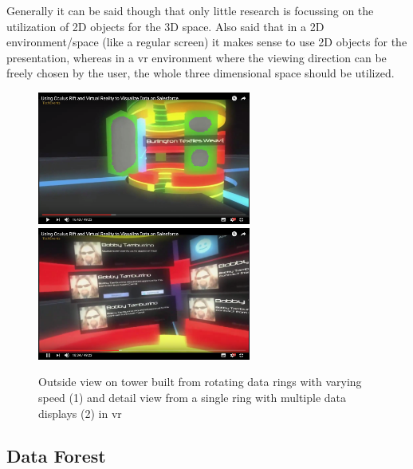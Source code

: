 Generally it can be said though that only little research is focussing on the utilization of 2D objects for the 3D space. Also \cite{Kwon2015} said that in a 2D environment/space (like a regular screen) it makes sense to use 2D objects for the presentation, whereas in a \gls{vr} environment where the viewing direction can be freely chosen by the user, the whole three dimensional space should be utilized.
\begin{figure}[h]
	\begin{center}
		\includegraphics[width=7cm]{03_Figures/05_LitReview/CodeScience2015b.png}
		\includegraphics[width=7cm]{03_Figures/05_LitReview/CodeScience2015a.png}
		\caption[Outside view on tower built from rotating data rings with varying speed and detail view from a single ring with multiple data displays in \gls{vr}]{Outside view on tower built from rotating data rings with varying speed (1) and detail view from a single ring with multiple data displays (2) in \gls{vr} \citep{CodeScience2015}}
		\label{fig:rotatingringstoweranddetail}
	\end{center}
\end{figure}



\subsection{Data Forest}


